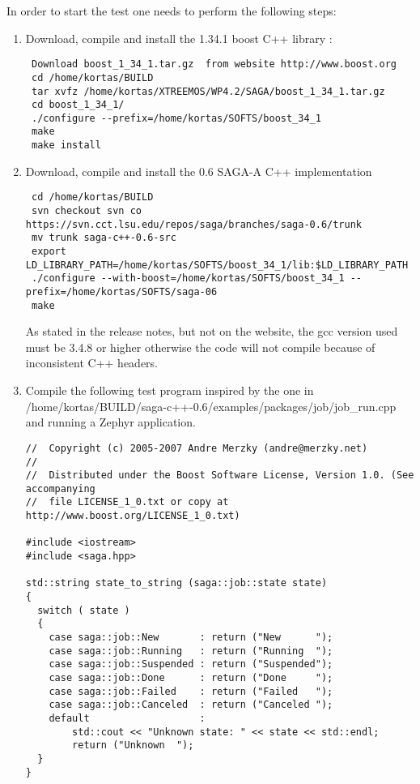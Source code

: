 In order to start the test one needs to perform the following steps:
\begin{enumerate}
\item Download, compile and install the 1.34.1 boost C++ library :
\begin{lstlisting}
 Download boost_1_34_1.tar.gz  from website http://www.boost.org	
 cd /home/kortas/BUILD
 tar xvfz /home/kortas/XTREEMOS/WP4.2/SAGA/boost_1_34_1.tar.gz 
 cd boost_1_34_1/
 ./configure --prefix=/home/kortas/SOFTS/boost_34_1
 make
 make install
\end{lstlisting}
\item Download, compile and install the 0.6 SAGA-A C++ implementation
\begin{lstlisting}
 cd /home/kortas/BUILD
 svn checkout svn co https://svn.cct.lsu.edu/repos/saga/branches/saga-0.6/trunk
 mv trunk saga-c++-0.6-src
 export LD_LIBRARY_PATH=/home/kortas/SOFTS/boost_34_1/lib:$LD_LIBRARY_PATH
 ./configure --with-boost=/home/kortas/SOFTS/boost_34_1 --prefix=/home/kortas/SOFTS/saga-06
 make
\end{lstlisting}
As stated in the release notes, but not on the website, the gcc
      version used must be 3.4.8 or higher otherwise the
      code will not compile because of inconsistent C++ headers.

\item Compile the following  test program inspired by the one in \\
    /home/kortas/BUILD/saga-c++-0.6/examples/packages/job/job\_run.cpp
      \\
     and running a Zephyr application.
\begin{lstlisting}
//  Copyright (c) 2005-2007 Andre Merzky (andre@merzky.net)
// 
//  Distributed under the Boost Software License, Version 1.0. (See accompanying 
//  file LICENSE_1_0.txt or copy at http://www.boost.org/LICENSE_1_0.txt)

#include <iostream>
#include <saga.hpp>

std::string state_to_string (saga::job::state state)
{
  switch ( state )
  {
    case saga::job::New       : return ("New      ");
    case saga::job::Running   : return ("Running  ");
    case saga::job::Suspended : return ("Suspended");
    case saga::job::Done      : return ("Done     ");
    case saga::job::Failed    : return ("Failed   ");
    case saga::job::Canceled  : return ("Canceled ");
    default                   : 
        std::cout << "Unknown state: " << state << std::endl;
        return ("Unknown  ");
  }
}




\end{lstlisting}
\end{enumerate}
